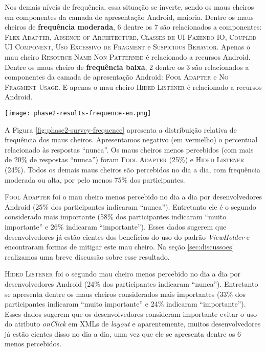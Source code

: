 Nos demais níveis de frequência, essa situação se inverte, sendo os maus cheiros em componentes da camada de apresentação Android, maioria. Dentre os maus cheiros de \textbf{\small frequência moderada}, 6 dentre os 7 são relacionados a componentes: \textsc{\small Flex Adapter}, \textsc{\small Absence of Architecture}, \textsc{\small Classes de UI Fazendo IO}, \textsc{\small Coupled UI Component}, \textsc{\small Uso Excessivo de Fragment} e \textsc{\small Suspicious Behavior}. Apenas o mau cheiro \textsc{\small Resource Name Non Patterned} é relacionado a recursos Android. Dentre os maus cheiro de \textbf{\small frequência baixa}, 2 dentre os 3 são relacionados a componentes da camada de apresentação Android: \textsc{\small Fool Adapter} e \textsc{\small No Fragment Usage}. E apenas o mau cheiro \textsc{\small Hided Listener} é relacionado a recursos Android.

\begin{figure*}[!htb]
  \centering
  \texttt{[image: phase2-results-frequence-en.png]}
  \caption{Distribuição relativa de frequência dos maus cheiros propostos.}
  \label{fig:phase2-survey-frequence}
\end{figure*}

A Figura \ref{fig:phase2-survey-frequence} apresenta a distribuição relativa de frequência dos maus cheiros. Apresentamos negativo (em vermelho) o percentual relacionado às respostas ``nunca''. Os maus cheiros menos percebidos (com mais de 20\% de respostas ``nunca'') foram \textsc{\small Fool Adapter} (25\%) e \textsc{\small Hided Listener} (24\%). Todos os demais maus cheiros são percebidos no dia a dia, com frequência moderada ou alta, por pelo menos 75\% dos participantes.

\textsc{\small Fool Adapter} foi o mau cheiro menos percebido no dia a dia por desenvolvedores Android (25\% dos participantes indicaram ``nunca''). Entretanto ele é o segundo considerado mais importante (58\% dos participantes indicaram ``muito importante'' e 26\% indicaram ``importante''). Esses dados sugerem que desenvolvedores já estão cientes dos benefícios do uso do padrão \textit{ViewHolder} \cite{AluraViewHolder} e encontraram formas de mitigar este mau cheiro. Na seção \ref{sec:discussoes} realizamos uma breve discussão sobre esse resultado.

\textsc{\small Hided Listener} foi o segundo mau cheiro menos percebido no dia a dia por desenvolvedores Android (24\% dos participantes indicaram ``nunca''). Entretanto se apresenta dentre os maus cheiros considerados mais importantes (33\% dos participantes indicaram ``muito importante'' e 24\% indicaram ``importante''). Esses dados sugerem que os desenvolvedores consideram importante evitar o uso do atributo \textit{onClick} em XMLs de \textit{layout} e aparentemente, muitos desenvolvedores já estão cientes disso no dia a dia, uma vez que ele se apresenta dentre os 6 menos percebidos. \\


